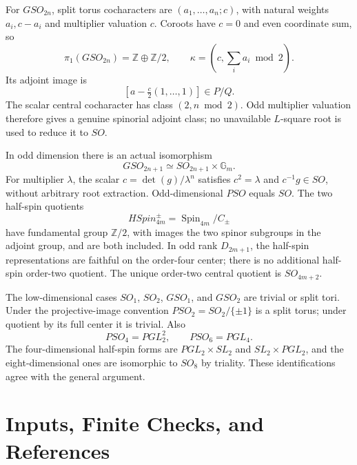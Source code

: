 \documentclass[11pt,a4paper]{article}
\theoremstyle{definition}
\theoremstyle{remark}
\begin{document}
For \(GSO_{2n}\), split torus cocharacters are
\((a_1,\ldots,a_n;c)\), with natural weights \(a_i,c-a_i\)
and multiplier valuation \(c\). Coroots have \(c=0\) and even
coordinate sum, so
\[
\pi_1(GSO_{2n})=\mathbb Z\oplus\mathbb Z/2,\qquad
\kappa=(c,\textstyle\sum_i a_i\bmod2).
\]
Its adjoint image is
\[
[a-\tfrac c2(1,\ldots,1)]\in P/Q.
\]
The scalar central cocharacter has class \((2,n\bmod2)\).
Odd multiplier valuation therefore gives a genuine spinorial
adjoint class; no unavailable \(L\)-square root is used to reduce
it to \(SO\).

In odd dimension there is an actual isomorphism
\[
GSO_{2n+1}\simeq SO_{2n+1}\times\mathbb G_m.
\]
For multiplier \(\lambda\), the scalar
\(c=\det(g)/\lambda^n\) satisfies \(c^2=\lambda\) and
\(c^{-1}g\in SO\), without arbitrary root extraction.
Odd-dimensional \(PSO\) equals \(SO\).
The two half-spin quotients
\[
HSpin_{4m}^{\pm}=\operatorname{Spin}_{4m}/C_\pm
\]
have fundamental group \(\mathbb Z/2\), with images the two spinor
subgroups in the adjoint group, and are both included.
In odd rank \(D_{2m+1}\), the half-spin representations are faithful
on the order-four center; there is no additional half-spin
order-two quotient. The unique order-two central quotient is
\(SO_{4m+2}\).

The low-dimensional cases \(SO_1\), \(SO_2\), \(GSO_1\), and \(GSO_2\)
are trivial or split tori. Under the projective-image convention
\(PSO_2=SO_2/\{\pm1\}\) is a split torus; under quotient by its full
center it is trivial. Also
\[
PSO_4=PGL_2^2,\qquad PSO_6=PGL_4.
\]
The four-dimensional half-spin forms are \(PGL_2\times SL_2\) and
\(SL_2\times PGL_2\), and the eight-dimensional ones are isomorphic
to \(SO_8\) by triality. These identifications agree with the
general argument.

\section{Inputs, Finite Checks, and References}\label{sec:inputs}
\end{document}
